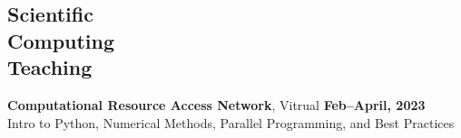 \documentclass[margin,line]{resume}
\begin{document}
\begin{resume}

    \section{\mysidestyle Scientific\\Computing\\Teaching}
    \textbf{Computational Resource Access Network}, Vitrual \hfill \textbf{Feb--April, 2023}\\
    Intro to Python, Numerical Methods, Parallel Programming, and Best Practices
               \vspace{2mm}\\



\end{resume}
\end{document}
